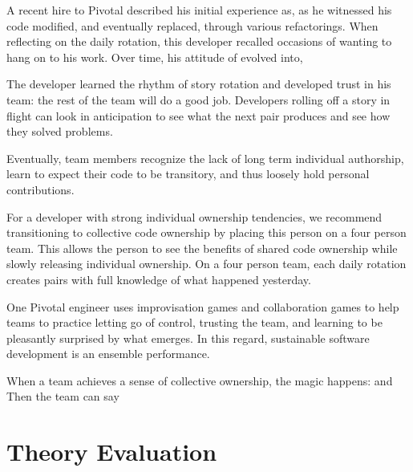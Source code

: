 \begin{table}[]
A recent hire to Pivotal described his initial experience as,  as he witnessed his code modified, and eventually replaced, through various refactorings. When reflecting on the daily rotation, this developer recalled occasions of wanting to hang on to his work.  Over time, his attitude of  evolved into,  

The developer learned the rhythm of story rotation and developed trust in his team: the rest of the team will do a good job. Developers rolling off a story in flight can look in anticipation to see what the next pair produces and see how they solved problems. 

Eventually, team members recognize the lack of long term individual authorship, learn to expect their code to be transitory, and thus loosely hold personal contributions.   

For a developer with strong individual ownership tendencies, we recommend transitioning to collective code ownership by placing this person on a four person team. This allows the person to see the benefits of shared code ownership while slowly releasing individual ownership. On a four person team, each daily rotation creates pairs with full knowledge of what happened yesterday.  


One Pivotal engineer uses improvisation games and collaboration games to help teams to practice letting go of control, trusting the team, and learning to be pleasantly surprised by what emerges. In this regard, sustainable software development is an ensemble performance. 

When a team achieves a sense of collective ownership, the magic happens:  and  Then the team can say 
\section{Theory Evaluation}
\label{TheoryEvaluation}


\end{table}
